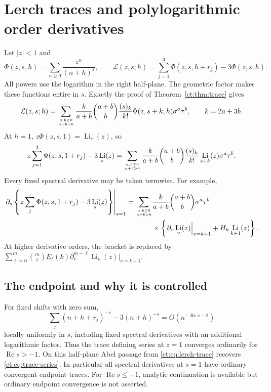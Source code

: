 \documentclass[11pt]{article}
\numberwithin{equation}{section}
\theoremstyle{definition}\newtheorem{definition}[theorem]{Definition}
\theoremstyle{remark}\newtheorem{remark}[theorem]{Remark}
\DeclareMathOperator{\Li}{Li}
\DeclareMathOperator{\Rea}{Re}
\newcommand{\Ltr}{\mathcal L}
\begin{document}
\section{Lerch traces and polylogarithmic order derivatives}
\label{ct:sec:lerch}
Let $|z|<1$ and
\[
 \Phi(z,s,h)=\sum_{n\ge0}\frac{z^n}{(n+h)^s},\qquad
 \Ltr(z,s;h)=\sum_{j=1}^3\Phi(z,s,h+r_j)-3\Phi(z,s,h).
\]
All powers use the logarithm in the right half-plane. The geometric factor
makes these functions entire in $s$. Exactly the proof of
Theorem~\ref{ct:thm:trace} gives
\begin{equation}\label{ct:eq:lerch-trace}
 \Ltr(z,s;h)=\sum_{a,b\ge0\atop a+b>0}
 \frac{k}{a+b}\binom{a+b}{b}\frac{(s)_k}{k!}
        \Phi(z,s+k,h)\sigma^a\tau^b,\qquad k=2a+3b.
\end{equation}
At $h=1$, $z\Phi(z,s,1)=\Li_s(z)$, so
\begin{equation}\label{ct:eq:polylog-trace}
 z\sum_{j=1}^3\Phi(z,s,1+r_j)-3\Li_s(z)
 =\sum_{a,b\ge0\atop a+b>0}
   \frac{k}{a+b}\binom{a+b}{b}\frac{(s)_k}{k!}
      \Li_{s+k}(z)\sigma^a\tau^b.
\end{equation}
Every fixed spectral derivative may be taken termwise. For example,
\begin{align}
 \left.\partial_s\left\{
 z\sum_j\Phi(z,s,1+r_j)-3\Li_s(z)\right\}\right|_{s=1}
   =\sum_{a,b\ge0\atop a+b>0}
       &\frac{k}{a+b}\binom{a+b}{b}\sigma^a\tau^b\notag\\
       &\times\left\{\left.\partial_v\Li_v(z)\right|_{v=k+1}
                             +H_k\Li_{k+1}(z)\right\}.
 \label{ct:eq:polylog-order-derivative}
\end{align}
At higher derivative orders, the bracket is replaced by
$\sum_{\ell=0}^m\binom m\ell E_\ell(k)
\partial_v^{m-\ell}\Li_v(z)|_{v=k+1}$.

\subsection{The endpoint and why it is controlled}
For fixed shifts with zero sum,
\[
 \sum_j(n+h+r_j)^{-s}-3(n+h)^{-s}=O(n^{-\Rea s-2})
\]
locally uniformly in $s$, including fixed spectral derivatives with an
additional logarithmic factor. Thus the trace defining series at $z=1$
converges ordinarily for $\Rea s>-1$. On this half-plane Abel passage from
\eqref{ct:eq:lerch-trace} recovers \eqref{ct:eq:trace-series}. In particular
all spectral derivatives at $s=1$ have ordinary convergent endpoint traces.
For $\Rea s\le-1$, analytic continuation is available but ordinary endpoint
convergence is not asserted.
\end{document}
